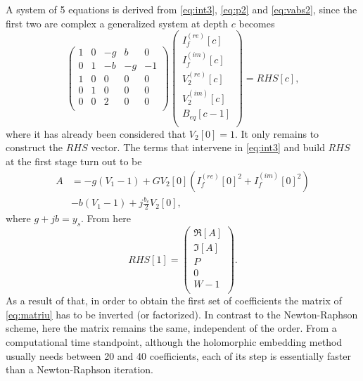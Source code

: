 \documentclass[conference]{IEEEtran}
\begin{document}
A system of 5 equations is derived from \eqref{eq:int3}, \eqref{eq:p2} and \eqref{eq:vabs2}, since the first two are complex a generalized system at depth $c$ becomes
\begin{equation}
  \begin{pmatrix}
    1 & 0 & -g & b & 0\\
    0 & 1 & -b & -g & -1\\
    1 & 0 & 0 & 0 & 0\\
    0 & 1 & 0 & 0 & 0\\
    0 & 0 & 2 & 0 & 0\\
  \end{pmatrix}
  \begin{pmatrix}
    I_f^{(re)}[c]\\
    I_f^{(im)}[c]\\
    V^{(re)}_2[c]\\
    V^{(im)}_2[c]\\
    B_{eq}[c-1]\\
  \end{pmatrix}
  =RHS[c],
  \label{eq:matriu}
\end{equation}
where it has already been considered that $V_2[0]=1$. It only remains to construct the $RHS$ vector. The terms that intervene in \eqref{eq:int3} and build $RHS$ at the first stage turn out to be
\begin{equation}
  \begin{split}
  A &= -g(V_1 - 1) + GV_2[0]\left(I^{(re)}_f[0]^2 + I^{(im)}_f[0]^2\right)\\ 
  &- b(V_1 - 1) + j\frac{b_c}{2}V_2[0],
  \end{split}
  \label{eq:A}
\end{equation}
where $g+jb=y_s$. From here
\begin{equation}
  RHS[1]=\begin{pmatrix}
    \Re[A]\\
    \Im[A]\\
    P\\
    0\\
    W-1\\
  \end{pmatrix}.
  \label{eq:rhs1}
\end{equation}
As a result of that, in order to obtain the first set of coefficients the matrix of \eqref{eq:matriu} has to be inverted (or factorized). In contrast to the Newton-Raphson scheme, here the matrix remains the same, independent of the order. From a computational time standpoint, although the holomorphic embedding method usually needs between 20 and 40 coefficients, each of its step is essentially faster than a Newton-Raphson iteration.  
\end{document}
